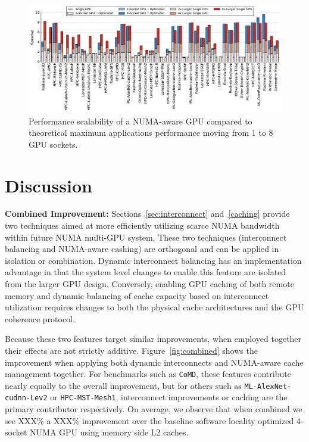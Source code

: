 \begin{figure}[t]
    \centering
    \includegraphics[width=1.0\textwidth]{figures/plot_scalability_mgpu_WB.pdf}
    \caption{Performance scalability of a NUMA-aware GPU compared to theoretical 
    maximum applications performance moving from 1 to 8 GPU sockets.}
    \label{fig:scalability}
    \vspace{-.2in}
\end{figure}

\section {Discussion}
\label{sec:discussion}
\textbf{Combined Improvement:} Sections~\ref{sec:interconnect} 
and~\ref{caching} provide two techniques aimed at more efficiently utilizing 
scarce NUMA bandwidth within future NUMA multi-GPU system. These two 
techniques (interconnect balancing and NUMA-aware cashing) are orthogonal and 
can be applied in isolation or combination.  Dynamic interconnect balancing 
has an implementation advantage in that the system level changes to enable 
this feature are isolated from the larger GPU design.  Conversely, enabling 
GPU caching of both remote memory and dynamic balancing of cache capacity 
based on interconnect utilization requires changes to both the physical cache 
architectures and the GPU coherence protocol.

Because these two features target similar improvements, when employed 
together their effects are not strictly additive.  Figure~\ref{fig:combined} 
shows the improvement when applying both dynamic interconnects and NUMA-aware 
cache management together.  For benchmarks such as \texttt{CoMD}, these 
features contribute nearly equally to the overall improvement, but for others 
such as \texttt{ML-AlexNet-cudnn-Lev2} or \texttt{HPC-MST-Mesh1}, 
interconnect improvements or caching are the primary contributor 
respectively.  On average, we observe that when combined we see XXX\% a XXX\% 
improvement over the baseline software locality optimized 4-socket NUMA GPU 
using memory side L2 caches.


